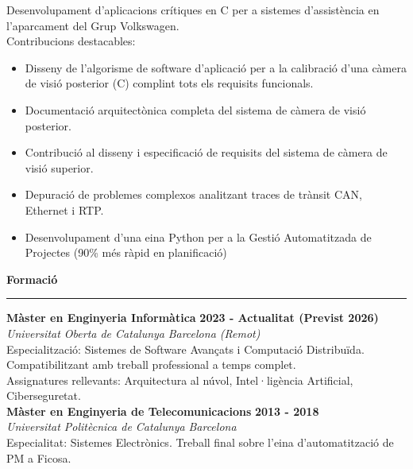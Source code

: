 \documentclass[11pt,a4paper]{article}
\newcommand{\cvsection}[1]{
    \vspace{0.5em}
    \noindent\textbf{\large #1}
    \vspace{0.5em}
    \hrule\vspace{0.5em}
}
\begin{document}
\begin{minipage}[t]{0.68\textwidth}
    Desenvolupament d'aplicacions crítiques en C per a sistemes d'assistència en l'aparcament del Grup Volkswagen.\\ Contribucions destacables:
    \begin{itemize}[leftmargin=*,topsep=2pt,itemsep=-1pt]
        \item Disseny de l'algorisme de software d'aplicació per a la calibració d'una càmera de visió posterior (C) complint tots els requisits funcionals.
        \item Documentació arquitectònica completa del sistema de càmera de visió posterior.
        \item Contribució al disseny i especificació de requisits del sistema de càmera de visió superior.
        \item Depuració de problemes complexos analitzant traces de trànsit CAN, Ethernet i RTP.
        \item Desenvolupament d'una eina Python per a la Gestió Automatitzada de Projectes (90\% més ràpid en planificació)
    \end{itemize}
    
    \cvsection{Formació}
    \noindent
    \textbf{Màster en Enginyeria Informàtica} \hfill \textbf{2023 - Actualitat (Previst 2026)} \\
    \textit{Universitat Oberta de Catalunya} \hfill \textit{Barcelona (Remot)} \\
    Especialització: Sistemes de Software Avançats i Computació Distribuïda.\\
    Compatibilitzant amb treball professional a temps complet.\\
    Assignatures rellevants: Arquitectura al núvol, Intel·ligència Artificial, Ciberseguretat.\\
    \noindent
    \textbf{Màster en Enginyeria de Telecomunicacions} \hfill \textbf{2013 - 2018} \\
    \textit{Universitat Politècnica de Catalunya} \hfill \textit{Barcelona}\\
    Especialitat: Sistemes Electrònics. Treball final sobre l'eina d'automatització de PM a Ficosa.\\    
\end{minipage}
\hspace{0.02\textwidth}
\end{document}
